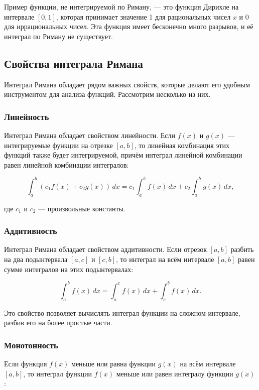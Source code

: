 Пример функции, не интегрируемой по Риману, — это функция Дирихле на интервале
\( [0, 1] \), которая принимает значение 1 для рациональных чисел \( x \) и 0
для иррациональных чисел. Эта функция имеет бесконечно много разрывов, и её
интеграл по Риману не существует.

\subsection{Свойства интеграла Римана}

Интеграл Римана обладает рядом важных свойств, которые делают его удобным
инструментом для анализа функций. Рассмотрим несколько из них.

\subsubsection{Линейность}

Интеграл Римана обладает свойством линейности. Если \( f(x) \) и \( g(x) \) —
интегрируемые функции на отрезке \( [a, b] \), то линейная комбинация этих
функций также будет интегрируемой, причём интеграл линейной комбинации равен
линейной комбинации интегралов:

\[ \int_a^b \left( c_1 f(x) + c_2 g(x) \right) \, dx = c_1 \int_a^b f(x) \, dx +
c_2 \int_a^b g(x) \, dx, \]

где \( c_1 \) и \( c_2 \) — произвольные константы.

\subsubsection{Аддитивность}

Интеграл Римана обладает свойством аддитивности. Если отрезок \( [a, b] \)
разбить на два подынтервала \( [a, c] \) и \( [c, b] \), то интеграл на всём
интервале \( [a, b] \) равен сумме интегралов на этих подынтервалах:

\[ \int_a^b f(x) \, dx = \int_a^c f(x) \, dx + \int_c^b f(x) \, dx.  \]

Это свойство позволяет вычислять интеграл функции на сложном интервале, разбив
его на более простые части.

\subsubsection{Монотонность}

Если функция \( f(x) \) меньше или равна функции \( g(x) \) на всём интервале \(
[a, b] \), то интеграл функции \( f(x) \) меньше или равен интегралу функции \(
g(x) \):

